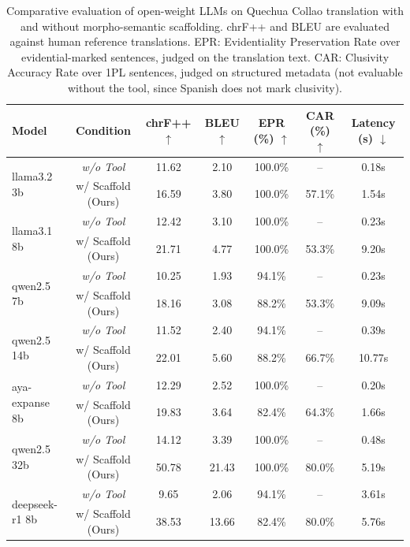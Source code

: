\begin{table}[t]
\centering
\small
\begin{tabular}{lcccccc}
\toprule
\textbf{Model} & \textbf{Condition} & \textbf{chrF++ $\uparrow$} & \textbf{BLEU $\uparrow$} & \textbf{EPR (\%) $\uparrow$} & \textbf{CAR (\%) $\uparrow$} & \textbf{Latency (s) $\downarrow$} \\
\midrule
\multirow{2}{*}{llama3.2 3b} & \textit{w/o Tool} & 11.62 & 2.10 & 100.0\% & -- & 0.18s \\
 & w/ Scaffold (Ours) & 16.59 & 3.80 & 100.0\% & 57.1\% & 1.54s \\
\midrule
\multirow{2}{*}{llama3.1 8b} & \textit{w/o Tool} & 12.42 & 3.10 & 100.0\% & -- & 0.23s \\
 & w/ Scaffold (Ours) & 21.71 & 4.77 & 100.0\% & 53.3\% & 9.20s \\
\midrule
\multirow{2}{*}{qwen2.5 7b} & \textit{w/o Tool} & 10.25 & 1.93 & 94.1\% & -- & 0.23s \\
 & w/ Scaffold (Ours) & 18.16 & 3.08 & 88.2\% & 53.3\% & 9.09s \\
\midrule
\multirow{2}{*}{qwen2.5 14b} & \textit{w/o Tool} & 11.52 & 2.40 & 94.1\% & -- & 0.39s \\
 & w/ Scaffold (Ours) & 22.01 & 5.60 & 88.2\% & 66.7\% & 10.77s \\
\midrule
\multirow{2}{*}{aya-expanse 8b} & \textit{w/o Tool} & 12.29 & 2.52 & 100.0\% & -- & 0.20s \\
 & w/ Scaffold (Ours) & 19.83 & 3.64 & 82.4\% & 64.3\% & 1.66s \\
\midrule
\multirow{2}{*}{qwen2.5 32b} & \textit{w/o Tool} & 14.12 & 3.39 & 100.0\% & -- & 0.48s \\
 & w/ Scaffold (Ours) & 50.78 & 21.43 & 100.0\% & 80.0\% & 5.19s \\
\midrule
\multirow{2}{*}{deepseek-r1 8b} & \textit{w/o Tool} & 9.65 & 2.06 & 94.1\% & -- & 3.61s \\
 & w/ Scaffold (Ours) & 38.53 & 13.66 & 82.4\% & 80.0\% & 5.76s \\
\bottomrule
\end{tabular}
\caption{Comparative evaluation of open-weight LLMs on Quechua Collao translation with and without morpho-semantic scaffolding. chrF++ and BLEU are evaluated against human reference translations. EPR: Evidentiality Preservation Rate over evidential-marked sentences, judged on the translation text. CAR: Clusivity Accuracy Rate over 1PL sentences, judged on structured metadata (not evaluable without the tool, since Spanish does not mark clusivity).}
\label{tab:local_models_benchmark}
\end{table}